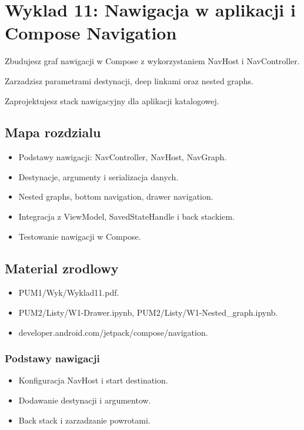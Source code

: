 \chapter{Wyklad 11: Nawigacja w aplikacji i Compose Navigation}

\begin{learningobjectives}
  \item Zbudujesz graf nawigacji w Compose z wykorzystaniem NavHost i NavController.
  \item Zarzadzisz parametrami destynacji, deep linkami oraz nested graphs.
  \item Zaprojektujesz stack nawigacyjny dla aplikacji katalogowej. 
\end{learningobjectives}

\section{Mapa rozdzialu}
\begin{itemize}
  \item Podstawy nawigacji: NavController, NavHost, NavGraph.
  \item Destynacje, argumenty i serializacja danych.
  \item Nested graphs, bottom navigation, drawer navigation.
  \item Integracja z ViewModel, SavedStateHandle i back stackiem.
  \item Testowanie nawigacji w Compose.
\end{itemize}

\section{Material zrodlowy}
\begin{itemize}
  \item PUM1/Wyk/Wyklad11.pdf.
  \item PUM2/Listy/W1-Drawer.ipynb, PUM2/Listy/W1-Nested\_graph.ipynb.
  \item developer.android.com/jetpack/compose/navigation.
\end{itemize}

\subsection{Podstawy nawigacji}
\begin{itemize}
  \item Konfiguracja NavHost i start destination.
  \item Dodawanie destynacji i argumentow.
  \item Back stack i zarzadzanie powrotami.
\end{itemize}

